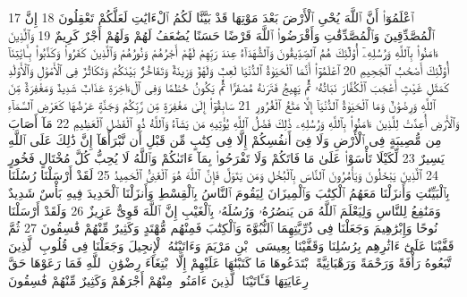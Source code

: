 {\tiny\colorbox{cl_aya}{17}} ٱعْلَمُوٓا۟ أَنَّ ٱللَّهَ يُحْىِ ٱلْأَرْضَ بَعْدَ مَوْتِهَا قَدْ بَيَّنَّا لَكُمُ ٱلْءَايَٰتِ لَعَلَّكُمْ تَعْقِلُونَ
{\tiny\colorbox{cl_aya}{18}} إِنَّ ٱلْمُصَّدِّقِينَ وَٱلْمُصَّدِّقَٰتِ وَأَقْرَضُوا۟ ٱللَّهَ قَرْضًا حَسَنًا يُضَٰعَفُ لَهُمْ وَلَهُمْ أَجْرٌ كَرِيمٌ
{\tiny\colorbox{cl_aya}{19}} وَٱلَّذِينَ ءَامَنُوا۟ بِٱللَّهِ وَرُسُلِهِۦٓ أُو۟لَٰٓئِكَ هُمُ ٱلصِّدِّيقُونَ وَٱلشُّهَدَآءُ عِندَ رَبِّهِمْ لَهُمْ أَجْرُهُمْ وَنُورُهُمْ وَٱلَّذِينَ كَفَرُوا۟ وَكَذَّبُوا۟ بِـَٔايَٰتِنَآ أُو۟لَٰٓئِكَ أَصْحَٰبُ ٱلْجَحِيمِ
{\tiny\colorbox{cl_aya}{20}} ٱعْلَمُوٓا۟ أَنَّمَا ٱلْحَيَوٰةُ ٱلدُّنْيَا لَعِبٌ وَلَهْوٌ وَزِينَةٌ وَتَفَاخُرٌۢ بَيْنَكُمْ وَتَكَاثُرٌ فِى ٱلْأَمْوَٰلِ وَٱلْأَوْلَٰدِ كَمَثَلِ غَيْثٍ أَعْجَبَ ٱلْكُفَّارَ نَبَاتُهُۥ ثُمَّ يَهِيجُ فَتَرَىٰهُ مُصْفَرًّا ثُمَّ يَكُونُ حُطَٰمًا وَفِى ٱلْءَاخِرَةِ عَذَابٌ شَدِيدٌ وَمَغْفِرَةٌ مِّنَ ٱللَّهِ وَرِضْوَٰنٌ وَمَا ٱلْحَيَوٰةُ ٱلدُّنْيَآ إِلَّا مَتَٰعُ ٱلْغُرُورِ
{\tiny\colorbox{cl_aya}{21}} سَابِقُوٓا۟ إِلَىٰ مَغْفِرَةٍ مِّن رَّبِّكُمْ وَجَنَّةٍ عَرْضُهَا كَعَرْضِ ٱلسَّمَآءِ وَٱلْأَرْضِ أُعِدَّتْ لِلَّذِينَ ءَامَنُوا۟ بِٱللَّهِ وَرُسُلِهِۦ ذَٰلِكَ فَضْلُ ٱللَّهِ يُؤْتِيهِ مَن يَشَآءُ وَٱللَّهُ ذُو ٱلْفَضْلِ ٱلْعَظِيمِ
{\tiny\colorbox{cl_aya}{22}} مَآ أَصَابَ مِن مُّصِيبَةٍ فِى ٱلْأَرْضِ وَلَا فِىٓ أَنفُسِكُمْ إِلَّا فِى كِتَٰبٍ مِّن قَبْلِ أَن نَّبْرَأَهَآ إِنَّ ذَٰلِكَ عَلَى ٱللَّهِ يَسِيرٌ
{\tiny\colorbox{cl_aya}{23}} لِّكَيْلَا تَأْسَوْا۟ عَلَىٰ مَا فَاتَكُمْ وَلَا تَفْرَحُوا۟ بِمَآ ءَاتَىٰكُمْ وَٱللَّهُ لَا يُحِبُّ كُلَّ مُخْتَالٍ فَخُورٍ
{\tiny\colorbox{cl_aya}{24}} ٱلَّذِينَ يَبْخَلُونَ وَيَأْمُرُونَ ٱلنَّاسَ بِٱلْبُخْلِ وَمَن يَتَوَلَّ فَإِنَّ ٱللَّهَ هُوَ ٱلْغَنِىُّ ٱلْحَمِيدُ
{\tiny\colorbox{cl_aya}{25}} لَقَدْ أَرْسَلْنَا رُسُلَنَا بِٱلْبَيِّنَٰتِ وَأَنزَلْنَا مَعَهُمُ ٱلْكِتَٰبَ وَٱلْمِيزَانَ لِيَقُومَ ٱلنَّاسُ بِٱلْقِسْطِ وَأَنزَلْنَا ٱلْحَدِيدَ فِيهِ بَأْسٌ شَدِيدٌ وَمَنَٰفِعُ لِلنَّاسِ وَلِيَعْلَمَ ٱللَّهُ مَن يَنصُرُهُۥ وَرُسُلَهُۥ بِٱلْغَيْبِ إِنَّ ٱللَّهَ قَوِىٌّ عَزِيزٌ
{\tiny\colorbox{cl_aya}{26}} وَلَقَدْ أَرْسَلْنَا نُوحًا وَإِبْرَٰهِيمَ وَجَعَلْنَا فِى ذُرِّيَّتِهِمَا ٱلنُّبُوَّةَ وَٱلْكِتَٰبَ فَمِنْهُم مُّهْتَدٍ وَكَثِيرٌ مِّنْهُمْ فَٰسِقُونَ
{\tiny\colorbox{cl_aya}{27}} ثُمَّ قَفَّيْنَا عَلَىٰٓ ءَاثَٰرِهِم بِرُسُلِنَا وَقَفَّيْنَا بِعِيسَى ٱبْنِ مَرْيَمَ وَءَاتَيْنَٰهُ ٱلْإِنجِيلَ وَجَعَلْنَا فِى قُلُوبِ ٱلَّذِينَ ٱتَّبَعُوهُ رَأْفَةً وَرَحْمَةً وَرَهْبَانِيَّةً ٱبْتَدَعُوهَا مَا كَتَبْنَٰهَا عَلَيْهِمْ إِلَّا ٱبْتِغَآءَ رِضْوَٰنِ ٱللَّهِ فَمَا رَعَوْهَا حَقَّ رِعَايَتِهَا فَـَٔاتَيْنَا ٱلَّذِينَ ءَامَنُوا۟ مِنْهُمْ أَجْرَهُمْ وَكَثِيرٌ مِّنْهُمْ فَٰسِقُونَ
